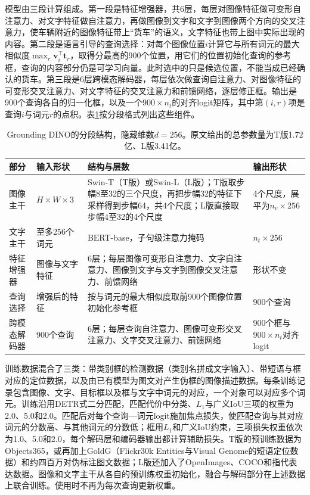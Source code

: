 模型由三段计算组成。第一段是特征增强器，共6层，每层对图像特征做可变形自注意力、对文字特征做自注意力，再做图像到文字和文字到图像两个方向的交叉注意力，使车辆附近的图像特征带上“货车”的语义，文字特征也带上图中实际出现的内容。第二段是语言引导的查询选择：对每个图像位置$i$计算它与所有词元的最大相似度$\max_r\bm{v}_i^\top\bm{t}_r$，取得分最高的900个位置，用它们的位置初始化查询的参考框，查询的内容部分仍是可学习向量。此时选中的只是候选位置，不能当成已经确认的货车。第三段是6层跨模态解码器，每层依次做查询自注意力、对图像特征的可变形交叉注意力、对文字特征的交叉注意力和前馈网络，逐层修正框。输出是900个查询各自的归一化框，以及一个$900\times n_t$的对齐logit矩阵，其中第$(i,r)$项是查询$i$与词元$r$的点积。表\ref{tab:vision-recognition-gdino-structure}按分段格式列出这些组件。

\begin{table}[tbp]
 \centering
 \small
 \begin{tabularx}{\linewidth}{@{}llXl@{}}
 \toprule
 部分 & 输入形状 & 结构与层数 & 输出形状\\
 \midrule
 图像主干 & $H\times W\times3$ & Swin-T（T版）或Swin-L（L版）；T版取步幅8至32的三个尺度，再把步幅32的特征下采样得到步幅64，共4个尺度；L版直接取步幅4至32的4个尺度 & 4个尺度，展平为$n_v\times256$\\
 文字主干 & 至多256个词元 & BERT-base，子句级注意力掩码 & $n_t\times256$\\
 特征增强器 & 图像与文字特征 & 6层；每层图像可变形自注意力、文字自注意力、图像到文字与文字到图像交叉注意力、前馈网络 & 形状不变\\
 查询选择 & 增强后的特征 & 按与词元的最大相似度取前900个图像位置初始化参考框 & 900个查询\\
 跨模态解码器 & 900个查询 & 6层；每层查询自注意力、图像可变形交叉注意力、文字交叉注意力、前馈网络 & 900个框与$900\times n_t$对齐logit\\
 \bottomrule
 \end{tabularx}
 \caption{Grounding DINO的分段结构，隐藏维数$d=256$。原文给出的总参数量为T版1.72亿、L版3.41亿。}
 \label{tab:vision-recognition-gdino-structure}
\end{table}

训练数据混合了三类：带类别框的检测数据（类别名拼成文字输入）、带短语与框对应的定位数据，以及由已有模型为图文对产生伪框的图像描述数据。每条训练记录包含图像、文字、目标框以及框与文字中词元的对应，一个对象可以对应多个词元。训练沿用DETR式二分匹配，匹配代价中分类、$L_1$与广义IoU三项的权重为2.0、5.0和2.0。匹配后对每个查询—词元logit施加焦点损失，使匹配查询与其对应词元的分数高、与其他词元的分数低；框用$L_1$和广义IoU约束，三项损失权重依次为1.0、5.0和2.0，每个解码层和编码器输出都计算辅助损失。T版的预训练数据为Objects365，或再加上GoldG（Flickr30k Entities与Visual Genome的短语定位数据）和约四百万对伪标注图文数据；L版还加入了OpenImages、COCO和指代表达数据。图像和文字主干从各自的预训练权重初始化，融合与解码部分在上述数据上联合训练。使用时不再为每次查询更新权重。

